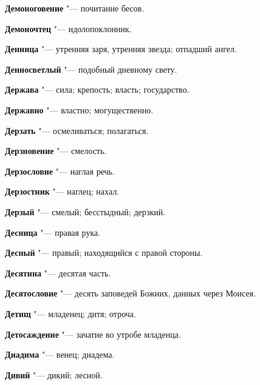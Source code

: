 \begin{mymulticols}{2}
\noindent\textbf{Демоноговение} "--- почитание бесов. 




\noindent\textbf{Демоночтец} "--- идолопоклонник. 




\noindent\textbf{Денница} "--- утренняя заря, утренняя звезда; отпадший ангел. 




\noindent\textbf{Денносветлый} "--- подобный дневному свету. 




\noindent\textbf{Держава} "--- сила; крепость; власть; государство. 




\noindent\textbf{Державно} "--- властно; могущественно. 




\noindent\textbf{Дерзать} "--- осмеливаться; полагаться. 




\noindent\textbf{Дерзновение} "--- смелость. 




\noindent\textbf{Дерзословие} "--- наглая речь. 




\noindent\textbf{Дерзостник} "--- наглец; нахал. 




\noindent\textbf{Дерзый} "--- смелый; бесстыдный; дерзкий. 




\noindent\textbf{Десница} "--- правая рука. 




\noindent\textbf{Десный} "--- правый; находящийся с правой стороны. 




\noindent\textbf{Десятина} "--- десятая часть. 




\noindent\textbf{Десятословие} "--- десять заповедей Божиих, данных через Моисея. 




\noindent\textbf{Детищ} "--- младенец; дитя; отроча. 




\noindent\textbf{Детосаждение} "--- зачатие во утробе младенца. 




\noindent\textbf{Диадима} "--- венец; диадема. 




\noindent\textbf{Дивий} "--- дикий; лесной. 





\end{mymulticols}
